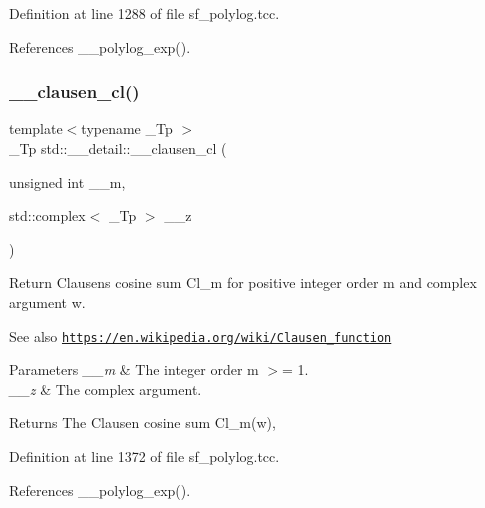 Definition at line 1288 of file sf\+\_\+polylog.\+tcc.



References \+\_\+\+\_\+polylog\+\_\+exp().

\mbox{\label{namespacestd_1_1____detail_ab09b3cb1a96ba96e7fddadd0ea717b1c}} 
\subsubsection{\texorpdfstring{\+\_\+\+\_\+clausen\+\_\+cl()}{\_\_clausen\_cl()}\hspace{0.1cm}{\footnotesize\ttfamily [1/2]}}
{\footnotesize\ttfamily template$<$typename \+\_\+\+Tp $>$ \\
\+\_\+\+Tp std\+::\+\_\+\+\_\+detail\+::\+\_\+\+\_\+clausen\+\_\+cl (\begin{DoxyParamCaption}\item[{unsigned int}]{\+\_\+\+\_\+m,  }\item[{std\+::complex$<$ \+\_\+\+Tp $>$}]{\+\_\+\+\_\+z }\end{DoxyParamCaption})}

Return Clausen\textquotesingle{}s cosine sum Cl\+\_\+m for positive integer order m and complex argument w. \begin{DoxySeeAlso}{See also}
\href{https://en.wikipedia.org/wiki/Clausen_function}{\tt https\+://en.\+wikipedia.\+org/wiki/\+Clausen\+\_\+function}
\end{DoxySeeAlso}

\begin{DoxyParams}{Parameters}
{\em \+\_\+\+\_\+m} & The integer order m $>$= 1. \\
\hline
{\em \+\_\+\+\_\+z} & The complex argument. \\
\hline
\end{DoxyParams}
\begin{DoxyReturn}{Returns}
The Clausen cosine sum Cl\+\_\+m(w), 
\end{DoxyReturn}


Definition at line 1372 of file sf\+\_\+polylog.\+tcc.



References \+\_\+\+\_\+polylog\+\_\+exp().

